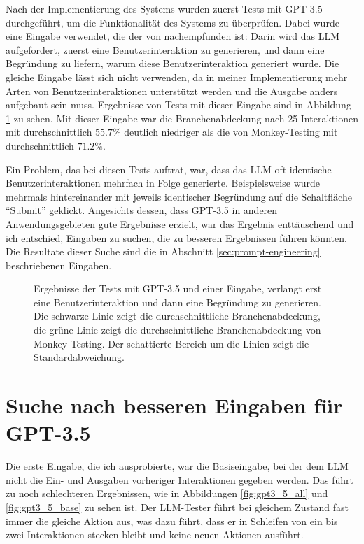 Nach der Implementierung des Systems wurden zuerst Tests mit GPT-3.5 durchgeführt, um die Funktionalität des Systems zu überprüfen.
Dabei wurde eine Eingabe verwendet, die der von  nachempfunden ist:
Darin wird das LLM aufgefordert, zuerst eine Benutzerinteraktion zu generieren, und dann eine Begründung zu liefern, warum diese Benutzerinteraktion generiert wurde.
Die gleiche Eingabe lässt sich nicht verwenden, da in meiner Implementierung mehr Arten von Benutzerinteraktionen unterstützt werden und die Ausgabe anders aufgebaut sein muss.
Ergebnisse von Tests mit dieser Eingabe sind in Abbildung \ref{fig:gpt3_5_explain_after} zu sehen.
Mit dieser Eingabe war die Branchenabdeckung nach 25 Interaktionen mit durchschnittlich $55.7\%$ deutlich niedriger als die von Monkey-Testing mit durchschnittlich $71.2\%$.

Ein Problem, das bei diesen Tests auftrat, war, dass das LLM oft identische Benutzerinteraktionen mehrfach in Folge generierte.
Beispielsweise wurde mehrmals hintereinander mit jeweils identischer Begründung auf die Schaltfläche \enquote{Submit} geklickt.
Angesichts dessen, dass GPT-3.5 in anderen Anwendungsgebieten gute Ergebnisse erzielt, war das Ergebnis enttäuschend und ich entschied, Eingaben zu suchen, die zu besseren Ergebnissen führen könnten.
Die Resultate dieser Suche sind die in Abschnitt \ref{sec:prompt-engineering} beschriebenen Eingaben.

\begin{figure}[h]
    \centering
    \caption{Ergebnisse der Tests mit GPT-3.5 und einer Eingabe, verlangt erst eine Benutzerinteraktion und dann eine Begründung zu generieren. Die schwarze Linie zeigt die durchschnittliche Branchenabdeckung, die grüne Linie zeigt die durchschnittliche Branchenabdeckung von Monkey-Testing. Der schattierte Bereich um die Linien zeigt die Standardabweichung.}
    \label{fig:gpt3_5_explain_after}
\end{figure}

\section{Suche nach besseren Eingaben für GPT-3.5}
\label{sec:prompt-engineering:2}

Die erste Eingabe, die ich ausprobierte, war die Basiseingabe, bei der dem LLM nicht die Ein- und Ausgaben vorheriger Interaktionen gegeben werden.
Das führt zu noch schlechteren Ergebnissen, wie in Abbildungen \ref{fig:gpt3_5_all} und \ref{fig:gpt3_5_base} zu sehen ist.
Der LLM-Tester führt bei gleichem Zustand fast immer die gleiche Aktion aus, was dazu führt, dass er in Schleifen von ein bis zwei Interaktionen stecken bleibt und keine neuen Aktionen ausführt.

